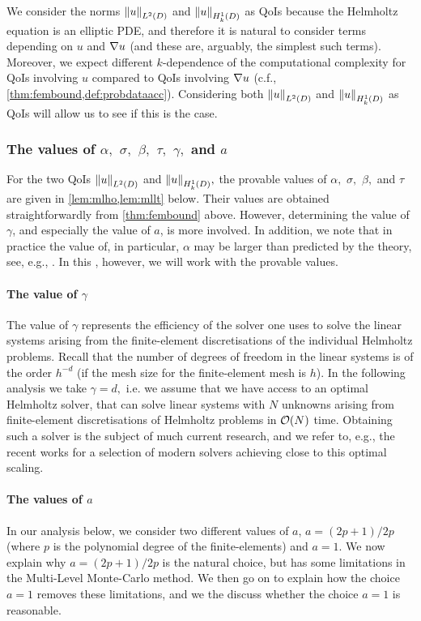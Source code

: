 We consider the norms $\NLtD{u}$ and $\NHokD{u}$ as QoIs because the Helmholtz equation is an elliptic PDE, and therefore it is natural to consider terms depending on $u$ and $\nabla u$ (and these are, arguably, the simplest such terms). Moreover, we expect different $k$-dependence of the computational complexity for QoIs involving $u$ compared to QoIs involving  $\nabla u$ (c.f., \cref{thm:fembound,def:probdataacc}). Considering both $\NLtD{u}$ and $\NHokD{u}$ as QoIs will allow us to see if this is the case.
\ere

\subsubsection{The values of $\alpha,$ $\sigma,$ $\beta,$ $\tau,$ $\gamma,$ and $a$}\label{sec:valuesmlmc}
For the two QoIs $\NLtD{u}$ and $\NHokD{u},$ the provable values of $\alpha,$ $\sigma,$ $\beta,$ and $\tau$ are given in \cref{lem:mlho,lem:mllt} below. Their values are obtained straightforwardly from \cref{thm:fembound} above. However, determining the value of $\gamma$, and especially the value of $a$, is more involved. In addition, we note that in practice the value of, in particular, $\alpha$ may be larger than predicted by the theory, see, e.g., \cite[Section 4]{ClGiScTe:11}. In this , however, we will work with the provable values.

\paragraph{The value of $\gamma$} The value of $\gamma$ represents the efficiency of the solver one uses to solve the linear systems arising from the finite-element discretisations of the individual Helmholtz problems. Recall that the number of degrees of freedom in the linear systems is of the order $h^{-d}$ (if the mesh size for the finite-element mesh is $h$). In the following analysis we take $\gamma = d,$ i.e. we assume that we have access to an optimal Helmholtz solver, that can solve linear systems with $N$ unknowns arising from finite-element discretisations of Helmholtz problems in $\mathcal O(N)$ time. Obtaining such a solver is the subject of much current research, and we refer to, e.g., the recent works \cite{GrSpVa:17,ZeScHeDe:19,TaZeHeDe:19} for a selection of modern solvers achieving close to this optimal scaling.

\paragraph{The values of $a$} In our analysis below, we consider two different values of $a$, $a=(2p+1)/2p$ (where $p$ is the polynomial degree of the finite-elements) and $a=1$. We now explain why $a=(2p+1)/2p$ is the natural choice, but has some limitations in the Multi-Level Monte-Carlo method. We then go on to explain how the choice $a=1$ removes these limitations, and we the discuss whether the choice $a=1$ is reasonable.

